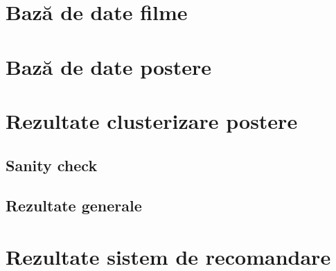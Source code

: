 \section{Bază de date filme}

\section{Bază de date postere}

\section{Rezultate clusterizare postere}

\subsection{Sanity check}

\subsection{Rezultate generale}

\section{Rezultate sistem de recomandare}
